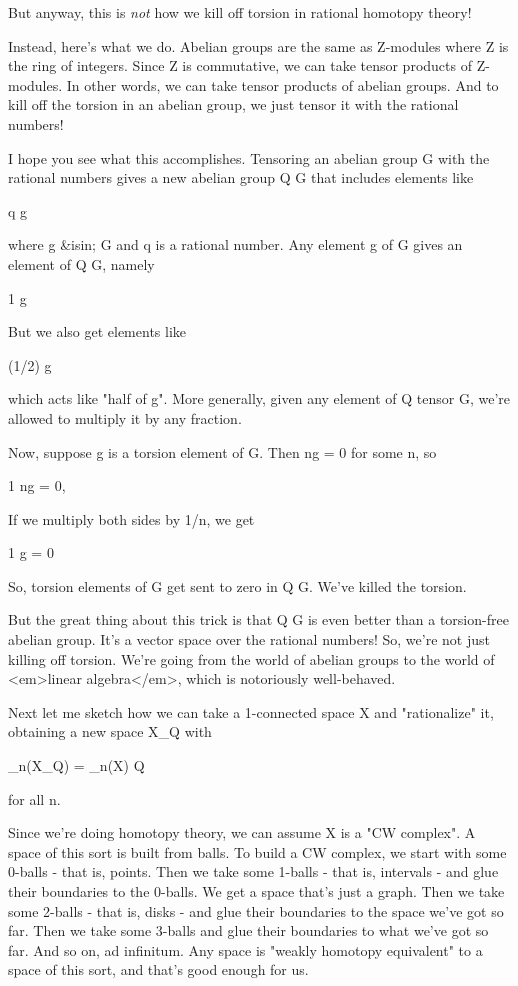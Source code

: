 But anyway, this is \emph{not} how we kill off torsion in rational homotopy 
theory!

Instead, here's what we do.  Abelian groups are the same as Z-modules
where Z is the ring of integers.  Since Z is commutative, we can take
tensor products of Z-modules.  In other words, we can take tensor
products of abelian groups.  And to kill off the torsion in an abelian
group, we just tensor it with the rational numbers!

I hope you see what this accomplishes.  Tensoring an abelian group G 
with the rational numbers gives a new abelian group Q \otimes  G that 
includes elements like

q \otimes  g

where g &isin; G and q is a rational number.   Any element g of G gives
an element of Q \otimes  G, namely 

1 \otimes  g

But we also get elements like

(1/2) \otimes  g

which acts like "half of g".  More generally, given any element of Q
tensor G, we're allowed to multiply it by any fraction.

Now, suppose g is a torsion element of G.  Then ng = 0 for some n, so

1 \otimes  ng = 0,

If we multiply both sides by 1/n, we get

1 \otimes  g = 0  

So, torsion elements of G get sent to zero in Q \otimes  G.  We've killed
the torsion.

But the great thing about this trick is that Q \otimes  G is even better
than a torsion-free abelian group.  It's a vector space over the
rational numbers!  So, we're not just killing off torsion.  We're
going from the world of abelian groups to the world of <em>linear
algebra</em>, which is notoriously well-behaved.

Next let me sketch how we can take a 1-connected space X and 
"rationalize" it, obtaining a new space X_{Q} with

\pi _{n}(X_{Q}) = \pi _{n}(X) \otimes  Q

for all n.  

Since we're doing homotopy theory, we can assume X is a "CW complex".
A space of this sort is built from balls.  To build a CW complex, we
start with some 0-balls - that is, points.  Then we take some 1-balls
- that is, intervals - and glue their boundaries to the 0-balls.  We
get a space that's just a graph.  Then we take some 2-balls - that is,
disks - and glue their boundaries to the space we've got so far.  Then
we take some 3-balls and glue their boundaries to what we've got so
far.  And so on, ad infinitum.  Any space is "weakly homotopy
equivalent" to a space of this sort, and that's good enough for us.

